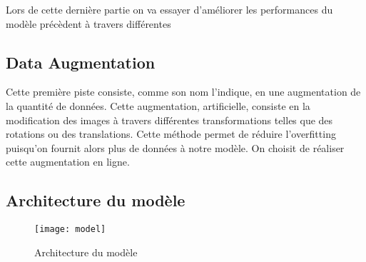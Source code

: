 \documentclass[12pt,a4paper,titlepage]{article}
\begin{document}
Lors de cette dernière partie on va essayer d'améliorer les performances
du modèle précèdent à travers différentes

\subsection{Data Augmentation}

Cette première piste consiste, comme son nom l'indique, en  une
augmentation de la quantité de données. Cette augmentation, artificielle,
consiste en la modification des images à travers différentes transformations
telles que des rotations ou des translations. Cette méthode permet de
réduire l'overfitting puisqu'on fournit alors plus de données à notre
modèle.  On choisit de réaliser cette augmentation en ligne.

\begin{appendices}

    \section{Architecture du modèle}

    \begin{figure}[H]
        \caption{Architecture du modèle}
        \texttt{[image: model]}
        \centering
    \end{figure}

\end{appendices}
\end{document}
